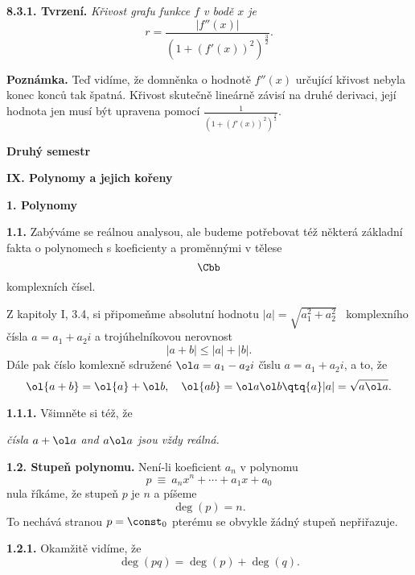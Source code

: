 \documentclass[12pt]{article}
\begin{document}
{ \medskip
 
 {\bf 8.3.1. Tvrzení.} {\em Křivost grafu funkce  $f$ v bodě $x$ je
 $$
 r=\frac{|f''(x)|}{(1+(f'(x))^2)^\frac32}.
 $$}\sq
 
 \medskip
 
 {\bf Poznámka.} Teď vidíme, že  domněnka o hodnotě $f''(x)$ určující křivost nebyla konec konců tak špatná. Křivost skutečně lineárně závisí na druhé derivaci, její hodnota jen musí být upravena  pomocí
 $\frac{1}{(1+(f'(x))^2)^\frac32}$.
 
 \newpage
 

 \centerline{\huge\bf Druhý semestr} 
 
 \vskip10mm
 
 \centerline{\Large\bf IX. Polynomy a jejich kořeny} 
 
 \vskip10mm
 
 
 \def\d{\text{d}}
 
 
 
 {\large\bf 1. Polynomy}
 
 \bigskip
 
 {\bf 1.1.} Zabýváme se reálnou analysou, ale budeme potřebovat též některá základní fakta o polynomech s koeficienty a proměnnými v tělese
 $$
 \Cbb
 $$
 komplexních čísel.
  
  \smallskip
  
  Z kapitoly I, 3.4,  si připomeňme absolutní hodnotu $|a|=\sqrt{a_1^2+a_2^2}$  \ komplexního čísla $a=a_1+a_2i$ a trojúhelníkovou nerovnost
  $$
  |a+b|\leq |a|+|b|.
  $$
 Dále pak číslo komlexně sdružené $\ol a=a_1-a_2i$ \v c\'\i slu $a=a_1+a_2i$, a to, že
 $$
 \ol{a+b}=\ol {a}+\ol b, \quad \ol{ab}=\ol a\ol b \qtq{a}|a|=\sqrt{a\ol a}.
 $$
 
 \medskip
 
 {\bf 1.1.1.} Všimněte si též, že
 
 \smallskip
 
 \centerline{\em čísla $a+\ol a$ and $a\ol a$ jsou vždy reálná.}
 
 \bigskip
 
 {\bf 1.2. Stupeň polynomu.} Není-li koeficient $a_n$ v polynomu 
 $$
 p\ \equiv\ a_nx^n+\cdots+a_1x+a_0
 $$
 nula říkáme, že stupeň  $p$ je $n$ a píšeme
 $$
 \deg(p)=n.
 $$
 To nechává stranou $p=\const_0$ pterému se obvykle žádný stupeň nepřiřazuje.
 
 \medskip
 
 {\bf 1.2.1.} Okamžitě vidíme, že
 $$
 \deg(pq)=\deg(p)+\deg (q).
 $$
 
 \bigskip
 
}
\end{document}
